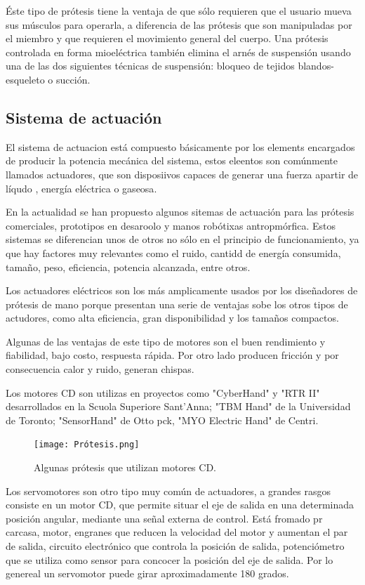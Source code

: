 \documentclass{article}
\begin{document}
Éste tipo de prótesis tiene la ventaja de que sólo requieren que el usuario mueva sus músculos para operarla, a diferencia de las prótesis que son manipuladas por el miembro y que requieren el movimiento general del cuerpo. Una prótesis controlada en forma mioeléctrica también elimina el arnés de suspensión usando una de las dos siguientes técnicas de suspensión: bloqueo de tejidos blandos-esqueleto o succión\cite{ff4}. 



\subsection{Sistema de actuación} 
El sistema de actuacion está compuesto básicamente por los elements encargados de producir la potencia mecánica del sistema, estos eleentos son comúnmente llamados actuadores, que son disposiivos capaces de generar una fuerza apartir de líqudo , energía eléctrica o gaseosa\cite{ff2}. 


En la actualidad se han propuesto algunos sitemas de actuación para las prótesis comerciales, prototipos en desaroolo y manos robótixas antropmórfica. Estos sistemas se diferencian unos de otros no sólo en el principio de funcionamiento, ya que hay factores muy relevantes como el ruido, cantidd de energía consumida, tamaño, peso, eficiencia, potencia alcanzada, entre otros\cite{ff2}. 

Los actuadores eléctricos son los más amplicamente usados por los diseñadores de prótesis de mano porque presentan una serie de ventajas sobe los otros tipos de actudores, como alta eficiencia, gran disponibilidad y los tamaños compactos\cite{ff2}.

Algunas de las ventajas de este tipo de motores son el buen rendimiento y fiabilidad, bajo costo, respuesta rápida. Por otro lado producen fricción y por consecuencia calor y ruido, generan chispas\cite{ff2}. 

Los motores CD son utilizas en proyectos como "CyberHand" y "RTR II" desarrollados en la Scuola Superiore Sant'Anna; "TBM Hand" de la Universidad de Toronto; "SensorHand" de Otto pck, "MYO Electric Hand" de Centri\cite{ff2}. 

\begin{figure}[H] %
    \centering
    \texttt{[image: Prótesis.png]} %
    \caption{Algunas prótesis que utilizan motores CD\cite{ff2}.}
    \label{grafica:cuatro}
\end{figure}

Los servomotores son otro tipo muy común de actuadores, a grandes rasgos consiste en un motor CD, que permite situar el eje de salida en una determinada posición angular, mediante una señal externa de control. Está fromado pr carcasa, motor, engranes que reducen la velocidad del motor y aumentan el par de salida, circuito electrónico que controla la posición de salida, potenciómetro que se utiliza como sensor para concocer la posición del eje de salida. Por lo genereal un servomotor puede girar aproximadamente 180 grados\cite{ff2}. 
\end{document}
